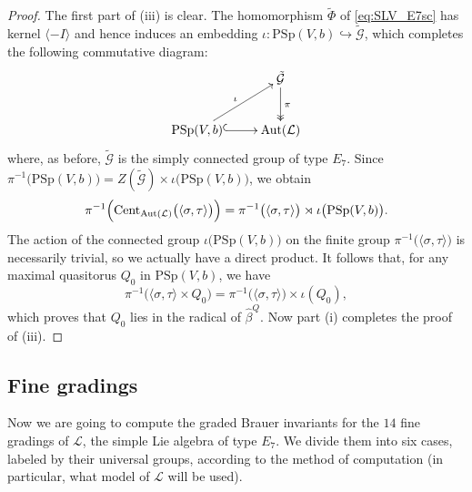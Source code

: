 \documentclass[a4paper,reqno]{amsart}
\theoremstyle{definition}
\numberwithin{theorem}{section}
\numberwithin{equation}{section}
\begin{document}
\begin{proof}
The first part of (iii) is clear. The homomorphism $\tilde{\Phi}$ of \eqref{eq:SLV_E7sc} has kernel $\langle-I\rangle$ and hence induces an embedding $\iota:{\mathrm{PSp}}(V,b)\hookrightarrow\tilde{\mathcal{G}}$, which completes the following commutative diagram:
\[
\xymatrix{
& \tilde{\mathcal{G}}\ar@{->>}[d]^{\pi}\\
{\mathrm{PSp}}(V,b)\ar@{^{(}->}[r] \ar[ur]^{\iota} & \operatorname{\mathrm{Aut}}({\mathcal{L}})
}
\]
where, as before, $\tilde{\mathcal{G}}$ is the simply connected group of type $E_7$. Since $\pi^{-1}\bigl({\mathrm{PSp}}(V,b)\bigr)=Z(\tilde{\mathcal{G}})\times\iota\bigl({\mathrm{PSp}}(V,b)\bigr)$, we obtain
\[
\pi^{-1}\Bigl(\operatorname{\mathrm{Cent}}_{\operatorname{\mathrm{Aut}}({\mathcal{L}})}\bigl(\langle\sigma,\tau\rangle\bigr)\Bigr)
=\pi^{-1}\bigl(\langle \sigma,\tau\rangle\bigr)\rtimes \iota\bigl({\mathrm{PSp}}(V,b)\bigr).
\]
The action of the connected group $\iota\bigl({\mathrm{PSp}}(V,b)\bigr)$ on the finite group $\pi^{-1}\bigl(\langle\sigma,\tau\rangle\bigr)$ is necessarily trivial, so we actually have a direct product. It follows that, for any maximal quasitorus $Q_0$ in ${\mathrm{PSp}}(V,b)$, we have
\[
\pi^{-1}\bigl(\langle \sigma,\tau\rangle\times Q_0\bigr)=\pi^{-1}\bigl(\langle\sigma,\tau\rangle\bigr)\times \iota(Q_0),
\]
which proves that $Q_0$ lies in the radical of $\hat\beta^Q$. Now part (i) completes the proof of (iii).
\end{proof}

\subsection{Fine gradings}\label{ss:E7_main}

Now we are going to compute the graded Brauer invariants for the $14$ fine gradings of ${\mathcal{L}}$, the simple Lie algebra of type $E_7$. We divide them into six cases, labeled by their universal groups, according to the method of computation (in particular, what model of ${\mathcal{L}}$ will be used).

\medskip
\end{document}
